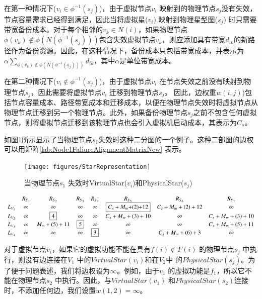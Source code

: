 在第一种情况下(${v_i} \in {\phi ^{ - 1}}({s_j})$)，由于虚拟节点$v_i$ 映射到的物理节点$s_j$没有失效，节点容量需求已经得到满足，因此当将虚拟星($v_i$) 映射到物理星型图($s_j$) 时只需要带宽备份成本。对于每个相邻的$v_k \in N(i)$，如果物理节点${\phi ({v_k}) \notin \phi (N({\phi ^{ - 1}}({s_j})))}$包含失效虚拟节点$v_k$，则应添加具有带宽$d_{ik}$的新路径作为备份资源。因此，在这种情况下，备份成本只包括带宽成本，并表示为$ { \alpha \sum\limits_{\phi ({v_k}) \notin \phi (N({\phi ^{ - 1}}({s_j})))} {{d_{ik}}} }$，其中$\alpha$是单位带宽成本。

在第二种情况下(${v_i} \notin {\phi ^{ - 1}}({s_j})$)，由于虚拟节点$v_i$ 在节点失效之前没有映射到物理节点$s_j$，因此需要将虚拟节点$v_i$ 迁移到物理节点$s_j$。 因此，边权重$w(i,j)$)包括节点容量成本、路径带宽成本和迁移成本，以便在物理节点失效时将虚拟节点从物理节点迁移到另一个物理节点。此外，如果备份物理节点$s_j$之前不包含任何虚拟节点，则将虚拟节点迁移到该物理节点也会引入虚拟机启动成本，其表示为$C_s$。

如图\ref{fig:StarRepresentation}所示显示了当物理节点$s_1$失效时这种二分图的一个例子。这种二部图的边权可以用矩阵\ref{lab:Node1FaliureAlignmentMatrixNew} 表示。
\begin{figure}
\centering
\texttt{[image: figures/StarRepresentation]}\\
  \caption{当物理节点$s_1$ 失效时VirtualStar($v_i$)和PhysicalStar($s_j$)}\label{fig:StarRepresentation}
\end{figure}

\begin{equation*}
\small{
 {\begin{array}{*{20}{c}}
&R_{S_{1}}&R_{S_{2}}&R_{S_3}&R_{S_4}&R_{S_5}&R_{S_6}&R_{S_{7}}\\
{L_{V_1}}&\infty&\infty&\infty&\infty&\fbox{$C_{s}+M_{m}$+(2)+12}&C_{s}+M_{m}+(2)+12&\infty\\
L_{V_2}&\infty&\fbox{4}&\infty&\infty&C_{s}+M_{m}+(3)+10&\infty&C_{s}+M_{m}+(3)+10\\
L_{V_3}&\infty&M_{m}+(5)+11&\fbox{5}&\infty&\infty&\infty&C_{s}+M_{m}+(5)+11\\
L_{V_4}&\infty&\infty&\infty&\fbox{3}&\infty&C_{s}+M_{m}+(6)+3&\infty\\
\end{array}}
}
\label{lab:Node1FaliureAlignmentMatrixNew}
\end{equation*}


对于虚拟节点$v_i$，如果它的虚拟功能不能在具有$f(i) \notin F(i)$ 的物理节点$s_j$ 中执行，则没有边连接在$V_1$ 中的$VirtualStar(v_i)$和在$V_2$中 的$PhysicalStar(s_j)$。为了便于问题表述，我们将边权设为$\infty $。例如，由于$v_1$ 的虚拟功能是$f_1$，所以它不能在物理节点$s_2$ 中执行。因此，与$VirtualStar(v_1)$ 和$PhysicalStar(s_2)$连接时，不添加任何边，我们设置$w(1,2)=\infty$。


